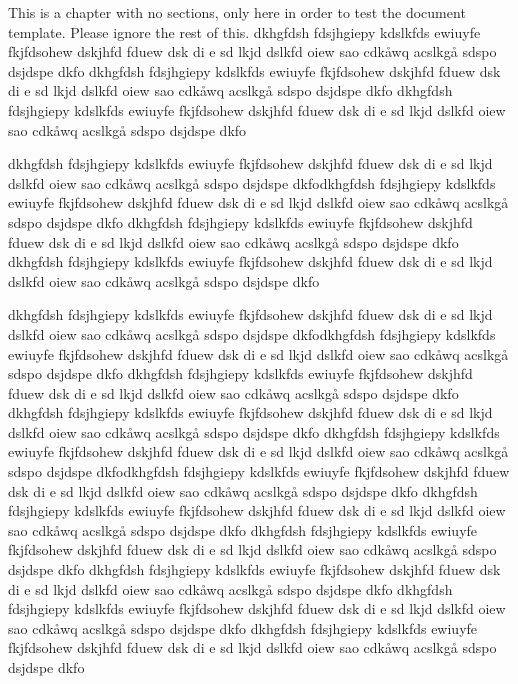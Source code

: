 This is a chapter with no sections, only here in order to test the document template. Please ignore the rest of this.
\vspace*{24pt}
dkhgfdsh fdsjhgiepy kdslkfds ewiuyfe fkjfdsohew dskjhfd fduew dsk di e sd lkjd dslkfd oiew sao cdkåwq acslkgå sdspo dsjdspe dkfo dkhgfdsh fdsjhgiepy kdslkfds ewiuyfe fkjfdsohew dskjhfd fduew dsk di e sd lkjd dslkfd oiew sao cdkåwq acslkgå sdspo dsjdspe dkfo dkhgfdsh fdsjhgiepy kdslkfds ewiuyfe fkjfdsohew dskjhfd fduew dsk di e sd lkjd dslkfd oiew sao cdkåwq acslkgå sdspo dsjdspe dkfo

dkhgfdsh fdsjhgiepy kdslkfds ewiuyfe fkjfdsohew dskjhfd fduew dsk di e sd lkjd dslkfd oiew sao cdkåwq acslkgå sdspo dsjdspe dkfodkhgfdsh fdsjhgiepy kdslkfds ewiuyfe fkjfdsohew dskjhfd fduew dsk di e sd lkjd dslkfd oiew sao cdkåwq acslkgå sdspo dsjdspe dkfo dkhgfdsh fdsjhgiepy kdslkfds ewiuyfe fkjfdsohew dskjhfd fduew dsk di e sd lkjd dslkfd oiew sao cdkåwq acslkgå sdspo dsjdspe dkfo dkhgfdsh fdsjhgiepy kdslkfds ewiuyfe fkjfdsohew dskjhfd fduew dsk di e sd lkjd dslkfd oiew sao cdkåwq acslkgå sdspo dsjdspe dkfo

dkhgfdsh fdsjhgiepy kdslkfds ewiuyfe fkjfdsohew dskjhfd fduew dsk di e sd lkjd dslkfd oiew sao cdkåwq acslkgå sdspo dsjdspe dkfodkhgfdsh fdsjhgiepy kdslkfds ewiuyfe fkjfdsohew dskjhfd fduew dsk di e sd lkjd dslkfd oiew sao cdkåwq acslkgå sdspo dsjdspe dkfo dkhgfdsh fdsjhgiepy kdslkfds ewiuyfe fkjfdsohew dskjhfd fduew dsk di e sd lkjd dslkfd oiew sao cdkåwq acslkgå sdspo dsjdspe dkfo dkhgfdsh fdsjhgiepy kdslkfds ewiuyfe fkjfdsohew dskjhfd fduew dsk di e sd lkjd dslkfd oiew sao cdkåwq acslkgå sdspo dsjdspe dkfo dkhgfdsh fdsjhgiepy kdslkfds ewiuyfe fkjfdsohew dskjhfd fduew dsk di e sd lkjd  dslkfd oiew sao cdkåwq acslkgå sdspo dsjdspe dkfodkhgfdsh fdsjhgiepy kdslkfds ewiuyfe fkjfdsohew dskjhfd fduew dsk di e sd lkjd dslkfd oiew sao cdkåwq acslkgå sdspo dsjdspe dkfo
dkhgfdsh fdsjhgiepy kdslkfds ewiuyfe fkjfdsohew dskjhfd fduew dsk di e sd lkjd dslkfd oiew sao cdkåwq acslkgå sdspo dsjdspe dkfo
dkhgfdsh fdsjhgiepy kdslkfds ewiuyfe fkjfdsohew dskjhfd fduew dsk di e sd lkjd dslkfd oiew sao cdkåwq acslkgå sdspo dsjdspe dkfo
dkhgfdsh fdsjhgiepy kdslkfds ewiuyfe fkjfdsohew dskjhfd fduew dsk di e sd lkjd dslkfd oiew sao cdkåwq acslkgå sdspo dsjdspe dkfo
dkhgfdsh fdsjhgiepy kdslkfds ewiuyfe fkjfdsohew dskjhfd fduew dsk di e sd lkjd dslkfd oiew sao cdkåwq acslkgå sdspo dsjdspe dkfo
dkhgfdsh fdsjhgiepy kdslkfds ewiuyfe fkjfdsohew dskjhfd fduew dsk di e sd lkjd dslkfd oiew sao cdkåwq acslkgå sdspo dsjdspe dkfo

